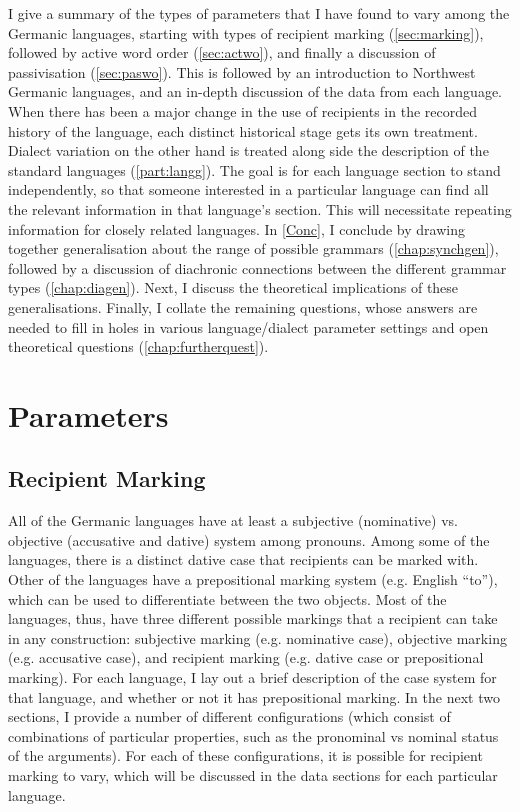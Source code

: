 I give a summary of the types of parameters that I have found to vary among the Germanic languages, starting with types of recipient marking (\autoref{sec:marking}), followed by active word order (\autoref{sec:actwo}), and finally a discussion of passivisation (\autoref{sec:paswo}). This is followed by an introduction to Northwest Germanic languages,  and an in-depth discussion of the data from each language. When there has been a major change in the use of recipients in the recorded history of the language, each distinct historical stage gets its own treatment. Dialect variation on the other hand is treated along side the description of the standard languages (\autoref{part:langg}). The goal is for each language section to stand independently, so that someone interested in a particular language can find all the relevant information in that language's section. This will necessitate repeating information for closely related languages. In \autoref{Conc}, I conclude by drawing together generalisation about the range of possible grammars (\autoref{chap:synchgen}), followed by a discussion of diachronic connections between the different grammar types (\autoref{chap:diagen}). Next, I discuss the theoretical implications of these generalisations. Finally, I collate the remaining questions, whose answers are needed to fill in holes in various language/dialect parameter settings and open theoretical questions (\autoref{chap:furtherquest}). 

\chapter{Parameters}

\section{Recipient Marking}\label{sec:marking}
All of the Germanic languages have at least a subjective (nominative) vs. objective (accusative and dative) system among pronouns. Among some of the languages, there is a distinct dative case that recipients can be marked with. Other of the languages have a prepositional marking system (e.g. English ``to''), which can be used to differentiate between the two objects. Most of the languages, thus, have three different possible markings that a recipient can take in any construction: subjective marking (e.g. nominative case), objective marking (e.g. accusative case), and recipient marking (e.g. dative case or prepositional marking). For each language, I lay out a brief description of the case system for that language, and whether or not it has prepositional marking. In the next two sections, I provide a number of different configurations (which consist of combinations of particular properties, such as the pronominal vs nominal status of the arguments). For each of these configurations, it is possible for recipient marking to vary, which will be discussed in the data sections for each particular language.

